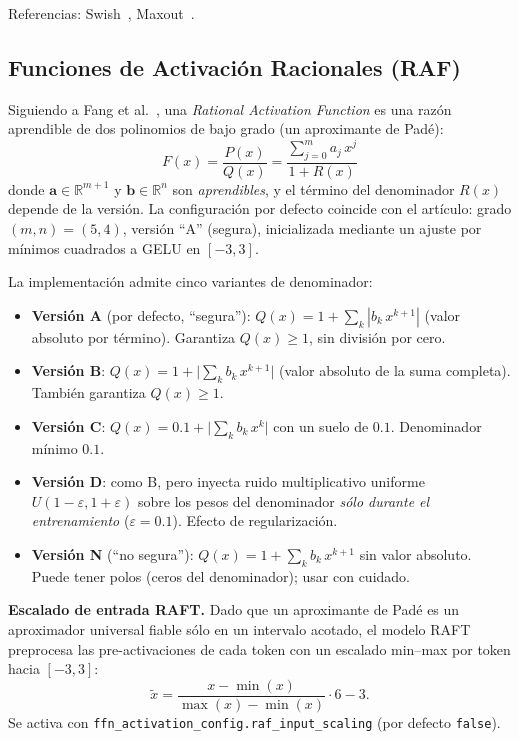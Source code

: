 \noindent Referencias: Swish~\citep{ramachandran2017swish},
Maxout~\citep{goodfellow2013maxout}.

\subsection{Funciones de Activación Racionales (RAF)}
\label{sec:raf-es}

Siguiendo a Fang et al.~\citep{fang2023raft}, una \emph{Rational Activation
Function} es una razón aprendible de dos polinomios de bajo grado (un
aproximante de Pad\'e):
\[
  F(x) = \frac{P(x)}{Q(x)}
        = \frac{\displaystyle\sum_{j=0}^{m} a_j\, x^{j}}
               {1 + R(x)}
\]
donde $\mathbf{a}\in\mathbb{R}^{m+1}$ y $\mathbf{b}\in\mathbb{R}^{n}$ son
\emph{aprendibles}, y el t\'ermino del denominador $R(x)$ depende de la
versión. La configuración por defecto coincide con el artículo:
grado $(m,n)=(5,4)$, versión ``A'' (segura), inicializada mediante un ajuste
por mínimos cuadrados a GELU en $[-3,3]$.

La implementación admite cinco variantes de denominador:

\begin{itemize}[leftmargin=*]
  \item \textbf{Versión A} (por defecto, ``segura''):
    $Q(x)=1+\sum_{k}|b_k\, x^{k+1}|$ (valor absoluto por t\'ermino).
    Garantiza $Q(x)\ge 1$, sin división por cero.
  \item \textbf{Versión B}: $Q(x)=1+\big|\sum_{k} b_k\, x^{k+1}\big|$
    (valor absoluto de la suma completa). También garantiza $Q(x)\ge 1$.
  \item \textbf{Versión C}: $Q(x)=0.1+\big|\sum_{k} b_k\, x^{k}\big|$
    con un suelo de $0.1$. Denominador mínimo $0.1$.
  \item \textbf{Versión D}: como B, pero inyecta ruido multiplicativo uniforme
    $U(1-\varepsilon, 1+\varepsilon)$ sobre los pesos del denominador
    \emph{sólo durante el entrenamiento} ($\varepsilon=0.1$). Efecto de
    regularización.
  \item \textbf{Versión N} (``no segura''):
    $Q(x)=1+\sum_{k} b_k\, x^{k+1}$ sin valor absoluto.
    Puede tener polos (ceros del denominador); usar con cuidado.
\end{itemize}

\textbf{Escalado de entrada RAFT.} Dado que un aproximante de Pad\'e es un
aproximador universal fiable sólo en un intervalo acotado, el modelo RAFT
preprocesa las pre-activaciones de cada token con un escalado min--max por
token hacia $[-3,3]$:
\[
  \tilde{x} = \frac{x-\min(x)}{\max(x)-\min(x)}\cdot 6 - 3.
\]
Se activa con \texttt{ffn\_activation\_config.raf\_input\_scaling}
(por defecto \texttt{false}).

